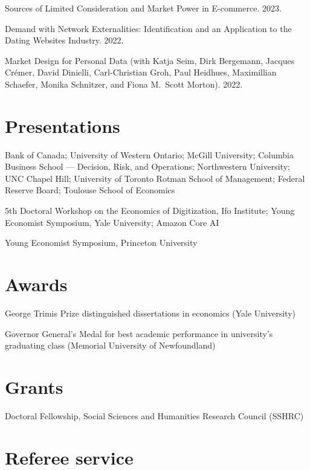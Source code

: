 \documentclass[11pt]{article} %
\begin{document}
\medskip

Sources of Limited Consideration and Market Power in E-commerce. 2023.

\medskip


 
Demand with Network Externalities: 
Identification and an Application to the Dating Websites Industry. 2022.




\medskip

Market Design for Personal Data
(with Katja Seim, Dirk Bergemann, Jacques Cr\'{e}mer, David Dinielli, 
Carl-Christian Groh, Paul Heidhues, Maximillian Schaefer, 
Monika Schnitzer, and Fiona M.\ Scott Morton).
2022.




\section*{Presentations}

 Bank of Canada; University of Western Ontario;
	McGill University; Columbia Business School --- Decision, Risk, and Operations;
	Northwestern University; UNC Chapel Hill; University of Toronto Rotman School
	of Management; Federal Reserve Board; Toulouse School of Economics


 5th Doctoral Workshop on the Economics of Digitization, Ifo Institute; 
	Young Economist Symposium, Yale University; Amazon Core AI


 Young Economist Symposium, Princeton University

\section*{Awards}

 George Trimis Prize distinguished dissertations in economics (Yale University)

 Governor General's Medal for best academic performance in university's graduating class
	(Memorial University of Newfoundland)

\section*{Grants}

 Doctoral Fellowship, Social Sciences and Humanities Research Council (SSHRC)


\section*{Referee service}
\end{document}
